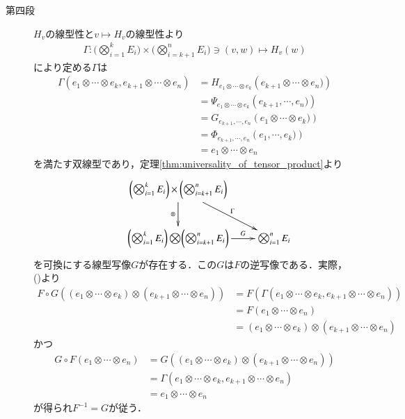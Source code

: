 \begin{prf}
\begin{description}
			\item[第四段]
				$H_v$の線型性と$v \longmapsto H_v$の線型性より
				\begin{align}
					\Gamma:\biggl( \bigotimes_{i=1}^k E_i \biggr) \times \biggl( \bigotimes_{i=k+1}^n E_i \biggr) \ni (v,w) \longmapsto H_v(w)
				\end{align}
				により定める$\Gamma$は
				\begin{align}
					\Gamma(e_1 \otimes \cdots \otimes e_k, e_{k+1} \otimes \cdots \otimes e_n) 
					&= H_{e_1 \otimes \cdots \otimes e_k}\left(e_{k+1} \otimes \cdots \otimes e_n) \right) \\
					&= \Psi_{e_1 \otimes \cdots \otimes e_k}\left(e_{k+1},\cdots,e_n) \right) \\
					&= G_{e_{k+1},\cdots,e_n}\left(e_1 \otimes \cdots \otimes e_k) \right) \\
					&= \Phi_{e_{k+1},\cdots,e_n}\left(e_1, \cdots, e_k) \right) \\
					&= e_1 \otimes \cdots \otimes e_n
					\label{eq:thm_associativity_of_tensor_products}
				\end{align}
				を満たす双線型であり，定理\ref{thm:universality_of_tensor_product}より
				\begin{align}
					\xymatrix{
						&\biggl( \bigotimes_{i=1}^k E_i \biggr) \times \biggl( \bigotimes_{i=k+1}^n E_i \biggr) \ar[d]_-\otimes \ar[rd]^-{\Gamma} & \\
						&\biggl( \bigotimes_{i=1}^k E_i \biggr) \bigotimes \biggl( \bigotimes_{i=k+1}^n E_i \biggr) \ar[r]^-{G} & \bigotimes_{i=1}^n E_i
					}
				\end{align}
				を可換にする線型写像$G$が存在する．この$G$は$F$の逆写像である．実際，
				()より
				\begin{align}
					F \circ G \left( (e_1 \otimes \cdots \otimes e_k) \otimes (e_{k+1} \otimes \cdots \otimes e_n) \right)
					&= F \left(\Gamma(e_1 \otimes \cdots \otimes e_k, e_{k+1} \otimes \cdots \otimes e_n) \right) \\
					&= F (e_1 \otimes \cdots \otimes e_n) \\
					&= (e_1 \otimes \cdots \otimes e_k) \otimes (e_{k+1} \otimes \cdots \otimes e_n)
				\end{align}
				かつ
				\begin{align}
					G \circ F \left( e_1 \otimes \cdots \otimes e_n \right)
					&= G \left( (e_1 \otimes \cdots \otimes e_k) \otimes (e_{k+1} \otimes \cdots \otimes e_n) \right) \\
					&= \Gamma\left(e_1 \otimes \cdots \otimes e_k,e_{k+1} \otimes \cdots \otimes e_n \right) \\
					&= e_1 \otimes \cdots \otimes e_n
				\end{align}
				が得られ$F^{-1} = G$が従う．
				\QED
		\end{description}
	\end{prf}